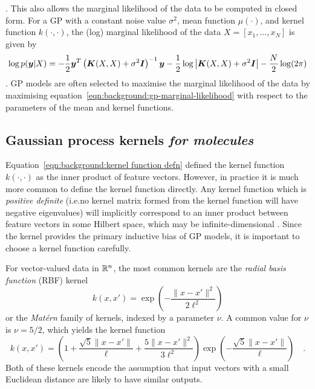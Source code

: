 \citep{rasmussen2006gp}.
This also allows the marginal likelihood of the data to be computed in closed form.
For a GP with a constant noise value $\sigma^2$,
mean function $\mu(\cdot)$, and kernel function $k(\cdot, \cdot)$,
the (log) marginal likelihood of the data $X=\left[x_1,\ldots,x_N\right]$
is given by
\begin{equation}\label{eqn:background:gp-marginal-likelihood}
    \log{p(\bm{y}|X)} =
        -\frac{1}{2}\bm{y}^T
            \left({\bm{K}}(X, X) + \sigma^2{\bm{I}}\right)^{-1}
            \bm{y}
        -\frac{1}{2}\log\left|{\bm{K}}(X, X) + \sigma^2{\bm{I}}\right|
        -\frac{N}{2}\log(2\pi)
\end{equation}
\citep{rasmussen2006gp}.
GP models are often selected to maximise the marginal likelihood of the data
by maximising equation~\ref{eqn:background:gp-marginal-likelihood}
with respect to the parameters of the mean and kernel functions.
    
\subsection{Gaussian process kernels \emph{for molecules}}
\label{sec:background:mol-kernels}

Equation~\ref{eqn:background:kernel function defn}
defined the kernel function $k(\cdot, \cdot)$ as the inner product of feature vectors.
However, in practice it is much more common to define the kernel function directly.
Any kernel function which is \emph{positive definite}
(i.e.\@ no kernel matrix formed from the kernel function will have negative eigenvalues)
will implicitly correspond to an inner product between feature vectors
in some Hilbert space, which may be infinite-dimensional
\citep{scholkopf2002learning}.
Since the kernel provides the primary inductive bias of GP models,
it is important to choose a kernel function carefully.

For vector-valued data in $\mathbb{R}^n$,
the most common kernels are the \emph{radial basis function} (RBF) kernel
\begin{equation}\label{eqn:rfb kernel defn}
    k(x, x') = \exp\left(-\frac{\|x - x'\|^2}{2\ell^2}\right)
\end{equation}
or the \emph{Mat\'ern} family of kernels, indexed by a parameter $\nu$.
A common value for $\nu$ is $\nu=5/2$,
which yields the kernel function
\begin{equation}\label{eqn:matern52 kernel defn}
    k(x, x') = \left(1 + \frac{\sqrt{5}\|x - x'\|}{\ell} + \frac{5\|x - x'\|^2}{3\ell^2}\right)
    \exp\left(-\frac{\sqrt{5}\|x - x'\|}{\ell}\right) \quad .
\end{equation}
Both of these kernels encode the assumption that input vectors
with a small Euclidean distance are likely to have similar outputs.

